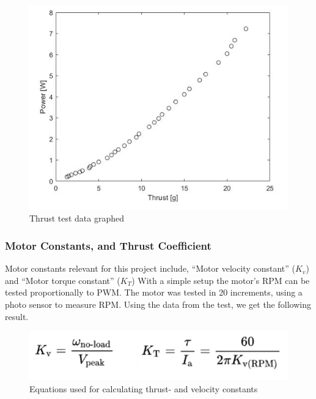 \begin{figure}[H]
\begin{center}
   \includegraphics[scale =1]{pictures/control/Graph thrust.JPG}
\end{center}
\caption{Thrust test data graphed}
\end{figure}

\subsubsection{Motor Constants, and Thrust Coefficient}
Motor constants relevant for this project include, “Motor velocity constant” ($K_v$) and “Motor torque constant” ($K_T$)
With a simple setup the motor's RPM can be tested proportionally to PWM. The motor was tested in 20 increments, using a photo sensor to measure RPM. Using the data from the test, we get the following result. \cite{MotorConstants}

\begin{figure}[H]
\begin{center}
   \includegraphics[scale =1]{pictures/control/Motor constants theory.png}
\end{center}
\caption{Equations used for calculating thrust- and velocity constants}
\end{figure}

